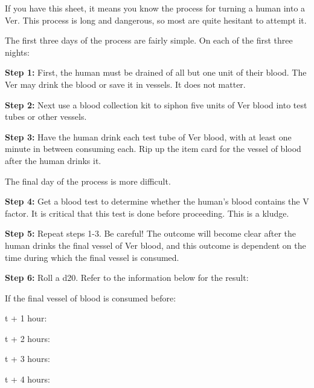 \documentclass[green]{guildcamp4}
\begin{document}
\name{\gTurning{}}

If you have this sheet, it means you know the process for turning a human into a Ver. This process is long and dangerous, so most are quite hesitant to attempt it.

The first three days of the process are fairly simple. On each of the first three nights:

{\bf Step 1:} First, the human must be drained of all but one unit of their blood. The Ver may drink the blood or save it in vessels. It does not matter. 

{\bf Step 2:} Next use a blood collection kit to siphon five units of Ver blood into test tubes or other vessels.

{\bf Step 3:} Have the human drink each test tube of Ver blood, with at least one minute in between consuming each. Rip up the item card for the vessel of blood after the human drinks it.

The final day of the process is more difficult.

{\bf Step 4:} Get a blood test to determine whether the human's blood contains the V factor. It is critical that this test is done before proceeding. This is a kludge.

{\bf Step 5:} Repeat steps 1-3. Be careful! The outcome will become clear after the human drinks the final vessel of Ver blood, and this outcome is dependent on the time during which the final vessel is consumed.

{\bf Step 6:} Roll a d20. Refer to the information below for the result:

If the final vessel of blood is consumed before:

t + 1 hour:



t + 2 hours:



t + 3 hours:



t + 4 hours:
\end{document}
